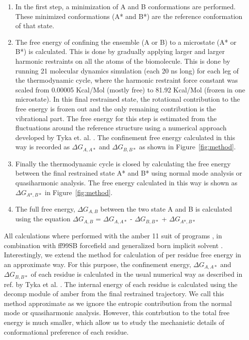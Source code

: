 \begin{enumerate}

\item  In the first step, a minimization of A and B conformations are performed. These minimized conformations (A* and B*)
       are the reference conformation of that state. 

\item  The free energy of confining the ensemble (A or B) to a microstate (A* or B*) is
       calculated. This is done by gradually applying larger and larger
       harmonic restraints on all the atoms of the biomolecule. This is done by running 21 molecular dynamics simulation
       (each 20 ns long) for each leg of the thermodynamic cycle, where the harmonic restraint force constant was scaled from 0.00005
       Kcal/Mol (mostly free) to 81.92 Kcal/Mol (frozen in one microstate). In this final restrained state, the
       rotational contribution to the free energy is frozen out
       and the only remaining contribution is the vibrational part. The free energy for this step is
       estimated from the fluctuations around
       the reference structure using a numerical
       approach developed by Tyka et. al. \cite{Tyka2006}. The confinement free energy calculated in
       this way is recorded as
       $\Delta G_{A,A*}$ and $\Delta G_{B,B*}$ as shown in Figure~\ref{fig:method}.

\item  Finally the thermodynamic cycle is closed by calculating the free energy between the final
       restrained state A* and B* using normal mode analysis or quasiharmonic analysis. The free energy calculated in
       this way is shown as $\Delta G_{A*,B*}$ in Figure~\ref{fig:method}.

\item  The full free energy, $\Delta G_{A,B}$ between the two state A and B is calculated using the equation
       $\Delta G_{A,B}$ = $\Delta G_{A,A*}$ - $\Delta G_{B,B*}$ + $\Delta G_{A*,B*}$

\end{enumerate}

All calculations where performed with the amber 11 suit of programs \cite{Case2012},\cite{Goetz2012} in 
combination with ff99SB forcefield\cite{Hornak2006} and generalized born implicit solvent \cite{Mongan2006}.
Interestingly, we extend the method for calculation of per residue free
energy in an approximate way. For this purpose, the confinement energy, $\Delta G_{A,A*}$ and
$\Delta G_{B,B*}$ of each residue is calculated in the usual numerical way as described in ref. by Tyka 
et al. \cite{Tyka2006}. The internal energy of each residue is calculated using the decomp module of amber from the final
restrained trajectory. We call this method approximate as we ignore the entropic contribution from the normal
mode or quasiharmonic analysis. However, this contrbution to the total free energy is much smaller,
which allow us to study the mechanistic details of conformational preference of each residue.

